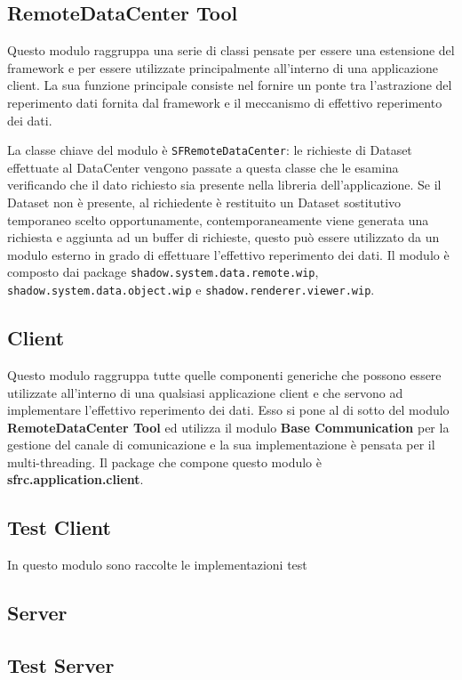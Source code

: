 \subsection{RemoteDataCenter Tool}
\label{sub:remotedatacentertoolmodule}
Questo modulo raggruppa una serie di classi pensate per essere una estensione del framework e per essere utilizzate principalmente all'interno di una applicazione client.
La sua funzione principale consiste nel fornire un ponte tra l'astrazione del reperimento dati fornita dal framework e il meccanismo di effettivo reperimento dei dati.

La classe chiave del modulo è \texttt{SFRemoteDataCenter}: le richieste di Dataset effettuate al DataCenter vengono passate a questa classe che le esamina verificando che il dato richiesto sia presente nella libreria dell'applicazione. Se il Dataset non è presente, al richiedente è restituito un Dataset sostitutivo temporaneo scelto opportunamente, contemporaneamente viene generata una richiesta e aggiunta ad un buffer di richieste, questo può essere utilizzato da un modulo esterno in grado di effettuare l'effettivo reperimento dei dati.
Il modulo è composto dai package \texttt{shadow.system.data.remote.wip}, \texttt{shadow.system.data.object.wip} e \texttt{shadow.renderer.viewer.wip}.

\subsection{Client}
\label{sub:clientmodule}
Questo modulo raggruppa tutte quelle componenti generiche che possono essere utilizzate all'interno di una qualsiasi applicazione client e che servono ad implementare l'effettivo reperimento dei dati. 
Esso si pone al di sotto del modulo \textbf{RemoteDataCenter Tool} ed utilizza il modulo \textbf{Base Communication} per la gestione del canale di comunicazione e la sua implementazione è pensata per il multi-threading.
Il package che compone questo modulo è \textbf{sfrc.application.client}.

\subsection{Test Client}
\label{sub:tclientmodule}
In questo modulo sono raccolte le implementazioni test

\subsection{Server}
\label{sub:servermodule}
\subsection{Test Server}
\label{sub:tservermodule}